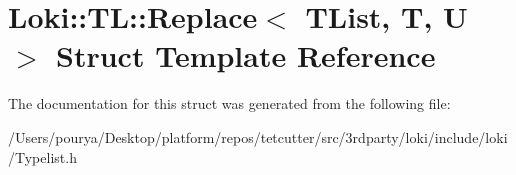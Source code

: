 \hypertarget{structLoki_1_1TL_1_1Replace}{}\section{Loki\+:\+:T\+L\+:\+:Replace$<$ T\+List, T, U $>$ Struct Template Reference}
\label{structLoki_1_1TL_1_1Replace}


The documentation for this struct was generated from the following file\+:\begin{DoxyCompactItemize}
\item 
/\+Users/pourya/\+Desktop/platform/repos/tetcutter/src/3rdparty/loki/include/loki/Typelist.\+h\end{DoxyCompactItemize}
